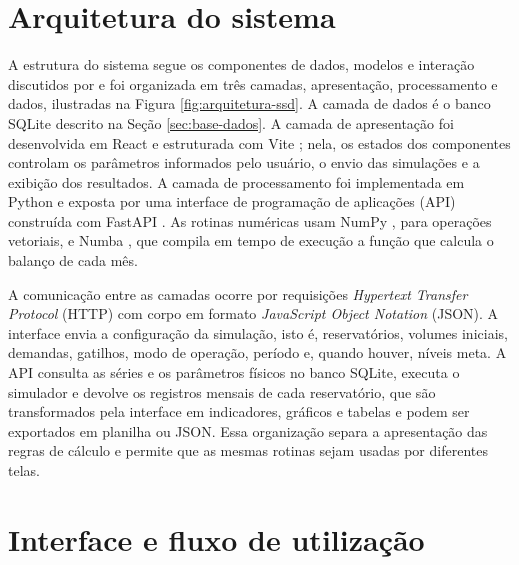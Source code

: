 \section{Arquitetura do sistema}
\label{sec:arquitetura}

A estrutura do sistema segue os componentes de dados, modelos e interação discutidos por  e foi organizada em três camadas, apresentação, processamento e dados, ilustradas na Figura \ref{fig:arquitetura-ssd}. A camada de dados é o banco SQLite descrito na Seção \ref{sec:base-dados}. A camada de apresentação foi desenvolvida em React \cite{react} e estruturada com Vite \cite{vite}; nela, os estados dos componentes controlam os parâmetros informados pelo usuário, o envio das simulações e a exibição dos resultados. A camada de processamento foi implementada em Python \cite{python} e exposta por uma interface de programação de aplicações (API) construída com FastAPI \cite{fastapi}. As rotinas numéricas usam NumPy \cite{harris2020numpy}, para operações vetoriais, e Numba \cite{lam2015numba}, que compila em tempo de execução a função que calcula o balanço de cada mês.

A comunicação entre as camadas ocorre por requisições \textit{Hypertext Transfer Protocol} (HTTP) com corpo em formato \textit{JavaScript Object Notation} (JSON). A interface envia a configuração da simulação, isto é, reservatórios, volumes iniciais, demandas, gatilhos, modo de operação, período e, quando houver, níveis meta. A API consulta as séries e os parâmetros físicos no banco SQLite, executa o simulador e devolve os registros mensais de cada reservatório, que são transformados pela interface em indicadores, gráficos e tabelas e podem ser exportados em planilha ou JSON. Essa organização separa a apresentação das regras de cálculo e permite que as mesmas rotinas sejam usadas por diferentes telas.

\begin{figure}[H]
    \centering
\end{figure}

\section{Interface e fluxo de utilização}
\label{sec:interface-fluxo}

